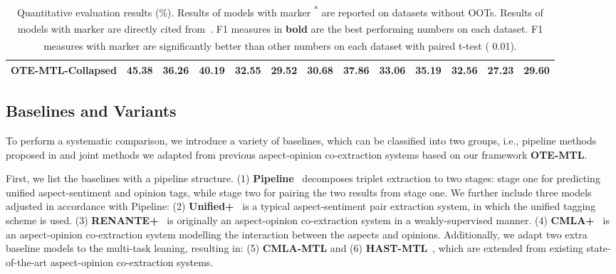 \documentclass[11pt,a4paper]{article}
\begin{document}
\begin{table*}[ht]
{\begin{tabular}{ccccccccccccc}
    OTE-MTL-Collapsed & 45.38 & 36.26 & 40.19 & 32.55 & 29.52 & 30.68 & 37.86 & 33.06 & 35.19 & 32.56 & 27.23 & 29.60\\
    \bottomrule
    \end{tabular}
    }
    \caption{Quantitative evaluation results (\%). Results of models with marker \textsuperscript{*} are reported on datasets without OOTs. Results of models with marker \textsuperscript{\dag} are directly cited from~\citet{peng2019knowing}. F1 measures in \textbf{bold} are the best performing numbers on each dataset. F1 measures with marker \textsuperscript{\ddag} are significantly better than other numbers on each dataset with paired t-test (  0.01).}
    \label{tab2}
\end{table*}

\subsection{Baselines and Variants}

To perform a systematic comparison, we introduce a variety of baselines, which can be classified into two groups, i.e., pipeline methods proposed in  and joint methods we adapted from previous aspect-opinion co-extraction systems based on our framework \textbf{OTE-MTL}.

First, we list the baselines with a pipeline structure. (1) \textbf{Pipeline}~\cite{peng2019knowing} decomposes triplet extraction to two stages: stage one for predicting unified aspect-sentiment and opinion tags, while stage two for pairing the two results from stage one. We further include three models adjusted in accordance with Pipeline: (2) \textbf{Unified+}~\cite{li2019unified} is a typical aspect-sentiment pair extraction system, in which the unified tagging scheme is used. (3) \textbf{RENANTE+}~\cite{dai2019neural} is originally an aspect-opinion co-extraction system in a weakly-supervised manner. (4) \textbf{CMLA+}~\cite{wang2017coupled} is an aspect-opinion co-extraction system modelling the interaction between the aspects and opinions. Additionally, we adapt two extra baseline models to the multi-task leaning, resulting in: (5) \textbf{CMLA-MTL} and (6) \textbf{HAST-MTL}~\cite{li2018aspect}, which are extended from existing state-of-the-art aspect-opinion co-extraction systems.  
\end{document}
